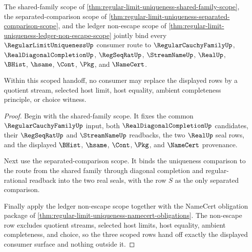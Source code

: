 \begin{theorem}
\label{thm:regular-limit-uniqueness-scoped-handoff}
The shared-family scope of \autoref{thm:regular-limit-uniqueness-shared-family-scope}, the separated-comparison scope of \autoref{thm:regular-limit-uniqueness-separated-comparison-scope}, and the ledger non-escape scope of \autoref{thm:regular-limit-uniqueness-ledger-non-escape-scope} jointly bind every $\RegularLimitUniquenessUp$ consumer route to $\RegularCauchyFamilyUp$, $\RealDiagonalCompletionUp$, $\RegSeqRatUp$, $\StreamNameUp$, $\RealUp$, $\BHist$, $\hsame$, $\Cont$, $\Pkg$, and $\NameCert$.

Within this scoped handoff, no consumer may replace the displayed rows by a quotient stream, selected host limit, host equality, ambient completeness principle, or choice witness.
\end{theorem}
\begin{proof}
Begin with the shared-family scope. It fixes the common $\RegularCauchyFamilyUp$ input, both $\RealDiagonalCompletionUp$ candidates, their $\RegSeqRatUp$ and $\StreamNameUp$ readbacks, the two $\RealUp$ seal rows, and the displayed $\BHist$, $\hsame$, $\Cont$, $\Pkg$, and $\NameCert$ provenance.

Next use the separated-comparison scope. It binds the uniqueness comparison to the route from the shared family through diagonal completion and regular-rational readback into the two real seals, with the row $S$ as the only separated comparison.

Finally apply the ledger non-escape scope together with the NameCert obligation package of \autoref{thm:regular-limit-uniqueness-namecert-obligations}. The non-escape row excludes quotient streams, selected host limits, host equality, ambient completeness, and choice, so the three scoped rows hand off exactly the displayed consumer surface and nothing outside it.
\end{proof}

